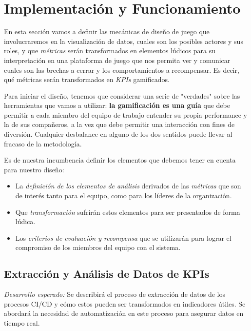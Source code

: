 \documentclass[journal]{IEEEtran}
\begin{document}
\section{\textbf{\Large Implementación y Funcionamiento}}

En esta sección vamos a definir las mecánicas de diseño de juego que involucraremos en la visualización de datos, cuales son los posibles actores y sus roles, y que \textit{métricas} serán transformados en elementos lúdicos para su interpretación en una plataforma de juego que nos permita ver y comunicar cuales son las brechas a cerrar y los comportamientos a recompensar. Es decir, qué métricas serán transformados en \textit{KPIs} gamificados. 

Para iniciar el diseño, tenemos que considerar una serie de "verdades" sobre las herramientas que vamos a utilizar: \textbf{la gamificación es una guía} que debe permitir a cada miembro del equipo de trabajo entender su propia performance y la de sus compañeros, a la vez que debe permitir una interacción con fines de diversión. Cualquier desbalance en alguno de los dos sentidos puede llevar al fracaso de la metodología\cite[Quinta Parte: Gamificación - De los desafíos y misiones]{nallar2015estructuraludica}.

Es de nuestra incumbencia definir los elementos que debemos tener en cuenta para nuestro diseño:

\begin{itemize}
    \item La \textit{definición de los elementos de análisis} derivados de las \textit{métricas} que son de interés tanto para el equipo, como para los líderes de la organización.
    \item Que \textit{transformación} sufrirán estos elementos para ser presentados de forma lúdica.
    \item Los \textit{criterios de evaluación y recompensa} que se utilizarán para lograr el compromiso de los miembros del equipo con el sistema.
\end{itemize}

\subsection{\textbf{Extracción y Análisis de Datos de KPIs}}

\textit{Desarrollo esperado:} Se describirá el proceso de extracción de datos de los procesos CI/CD y cómo estos pueden ser transformados en indicadores útiles. Se abordará la necesidad de automatización en este proceso para asegurar datos en tiempo real.
\end{document}
